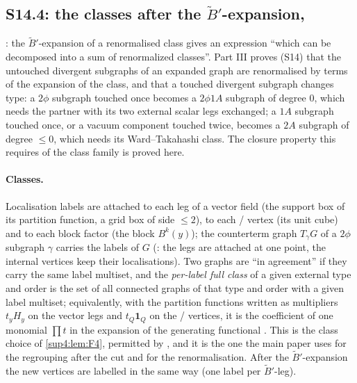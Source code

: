 
\subsection{S14.4: the classes after the $\tilde B'$-expansion, \cite[p.~433]{Ba3}}\label{sup4:ssec:S144}

\cite[p.~433]{Ba3}: the $\tilde B'$-expansion of a renormalised class gives an expression ``which can be decomposed into a sum of renormalized classes''. Part III proves (S14) that the untouched divergent subgraphs of an expanded graph are renormalised by terms of the expansion of the class, and that a touched divergent subgraph changes type: a $2\phi$ subgraph touched once becomes a $2\phi1A$ subgraph of degree $0$, which needs the partner with its two external scalar legs exchanged; a $1A$ subgraph touched once, or a vacuum component touched twice, becomes a $2A$ subgraph of degree $\le0$, which needs its Ward--Takahashi class. The closure property this requires of the class family is proved here.

\paragraph{Classes.} Localisation labels are attached to each leg of a vector field (the support box of its partition function, a grid box of side $\le2$), to each \cite[(1.6)]{Ba3}/\cite[(1.7)]{Ba3} vertex (its unit cube) and to each block factor \cite[(1.13)--(1.15)]{Ba3} (the block $B^k(y)$); the counterterm graph $T_\gamma G$ of a $2\phi$ subgraph $\gamma$ carries the labels of $G$ (\cite[p.~417]{Ba3}: the legs are attached at one point, the internal vertices keep their localisations). Two graphs are ``in agreement'' \cite[p.~432]{Ba3} if they carry the same label multiset, and the \emph{per-label full class} of a given external type and order is the set of all connected graphs of that type and order with a given label multiset; equivalently, with the partition functions written as multipliers $t_yH_y$ on the vector legs and $t_Q\mathbf 1_Q$ on the \cite[(1.6)]{Ba3}/\cite[(1.7)]{Ba3} vertices, it is the coefficient of one monomial $\prod t$ in the expansion of the generating functional \cite[(1.5)]{Ba3}. This is the class choice of \cref{sup4:lem:F4}, permitted by \cite[p.~431]{Ba3}, and it is the one the main paper uses for the regrouping after the cut and for the renormalisation. After the $\tilde B'$-expansion the new vertices are labelled in the same way (one label per $\tilde B'$-leg).


